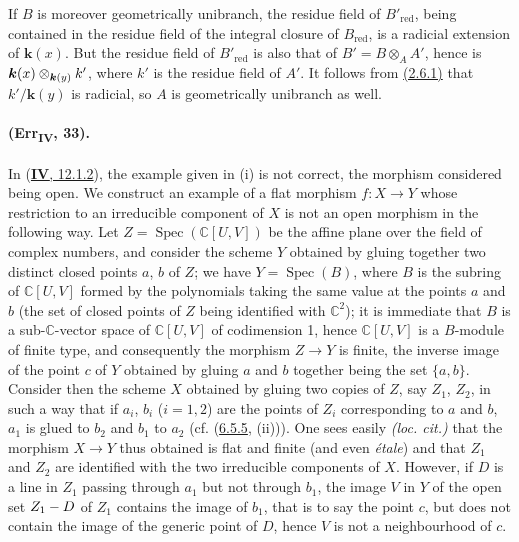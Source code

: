 {If $B$ is moreover geometrically unibranch, the residue field of
$B'_{\mathrm{red}}$, being contained in the residue field of the
integral closure of $B_{\mathrm{red}}$, is a radicial extension of
$\boldsymbol{k}(x)$.  But the residue field of $B'_{\mathrm{red}}$ is also that of
$B'=B\otimes_A A'$, hence is
$\boldsymbol{k}(x)\otimes_{\boldsymbol{k}(y)}k'$, where $k'$ is the residue field of $A'$.  It
follows from {\hyperref[IV.2.6.1]{(2.6.1)}} that $k'/\boldsymbol{k}(y)$ is radicial, so $A$ is geometrically
unibranch as well.

\paragraph{(Err\textsubscript{\textmd{IV}}, 33).}
In ({\hyperref[IV.12.1.2]{\textbf{IV}, 12.1.2}}), the example given
in (i) is not correct, the morphism considered being open. We
construct an example of a flat morphism $f:X\to Y$ whose restriction
to an irreducible component of $X$ is not an open morphism in
the following way. Let $Z=\operatorname{Spec}(\mathbb C[U,V])$ be the
affine plane over the field of complex numbers, and consider the
scheme $Y$ obtained by gluing together two distinct closed points $a$, $b$ of
$Z$; we have $Y=\operatorname{Spec}(B)$, where $B$ is the subring of
$\mathbb C[U,V]$ formed by the polynomials taking the same value at the points
$a$ and $b$ (the set of closed points of $Z$ being identified with
$\mathbb C^2$); it is immediate that $B$ is a sub-$\mathbb C$-vector
space of $\mathbb C[U,V]$ of codimension 1, hence $\mathbb C[U,V]$
is a $B$-module of finite type, and consequently the morphism $Z\to Y$ is
finite, the inverse image of the point $c$ of $Y$ obtained by gluing
$a$ and $b$ together being the set $\{a,b\}$.
Consider then the scheme $X$ obtained by gluing two copies of
$Z$, say $Z_1$, $Z_2$, in such a way that if $a_i$, $b_i$ ($i=1,2$) are
the points of $Z_i$ corresponding to $a$ and $b$, $a_1$ is glued to
$b_2$ and $b_1$ to $a_2$ (cf. ({\hyperref[IV.6.5.5]{6.5.5}},
(ii))). One sees easily \emph{(loc. cit.)} that the morphism $X\to Y$
thus obtained is flat and finite (and even \emph{\'etale}) and that $Z_1$ and $Z_2$
are identified with the two irreducible components of $X$. However, if
$D$ is a line in $Z_1$ passing through $a_1$ but not through $b_1$,
the image $V$ in $Y$ of the open set $Z_1- D$ of $Z_1$ contains the image of
$b_1$, that is to say the point $c$, but does not contain the image of the
generic point of $D$, hence $V$ is not a neighbourhood of $c$.

}
